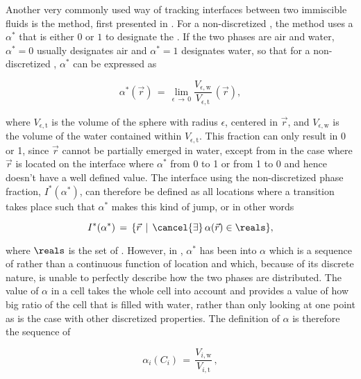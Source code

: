Another very commonly used way of tracking interfaces between two immiscible fluids is the \VOF method, first presented in \citeyear{Hirt1981} \citep{Hirt1981}. For a non-discretized \PDE, the \VOF method uses a  $\alpha^*$ that is either $0$ or $1$ to designate the \phase. If the two phases are air and water, $\alpha^* = 0$ usually designates air and $\alpha^* = 1$ designates water, so that for a non-discretized \PDE, $\alpha^*$ can be expressed as

\begin{equation} \label{eq:phase_fraction_continuous}
\alpha^*(\vec{r}) \,=\, \lim_{\epsilon\,\rightarrow\,0} \frac{V_{\epsilon,\text{w}}}{V_{\epsilon,\text{t}}}\,(\vec{r}),
\end{equation}

where $V_{\epsilon,\text{t}}$ is the volume of the sphere with radius $\epsilon$, centered in $\vec{r}$, and $V_{\epsilon,\text{w}}$ is the volume of the water contained within $V_{\epsilon,\text{t}}$. This fraction can only result in 0 or 1, since $\vec{r}$ cannot be partially emerged in water, except from in the case where $\vec{r}$ is located on the interface where $\alpha^*$  from 0 to 1 or from 1 to 0 and hence doesn't have a well defined value. The interface using the non-discretized phase fraction, $I^*(\alpha^*)$, can therefore be defined as all locations where a transition takes place such that $\alpha^*$ makes this kind of jump, or in other words

\begin{equation} \label{eq:vof_interface_continuous}
I^*(\alpha^*) \,=\, \{\vec{r} \,\mid\, \cancel{\exists}\,\alpha(\vec{r})\in\reals\},
\end{equation}

where $\reals$ is the set of . However, in \thisprojectwork, $\alpha^*$ has been \discretized into $\alpha$ which is a sequence of  rather than a continuous function of location and which, because of its discrete nature, is unable to perfectly describe how the two phases are distributed. The value of $\alpha$ in a cell takes the whole cell into account and provides a value of how big ratio of the cell that is filled with water, rather than only looking at one point as is the case with other discretized properties. The definition of $\alpha$ is therefore the sequence of

\begin{equation} \label{eq:phase_fraction_discretized}
\alpha_i(C_i) \,=\, \frac{V_{i,\text{w}}}{V_{i,\text{t}}}\,,
\end{equation}

